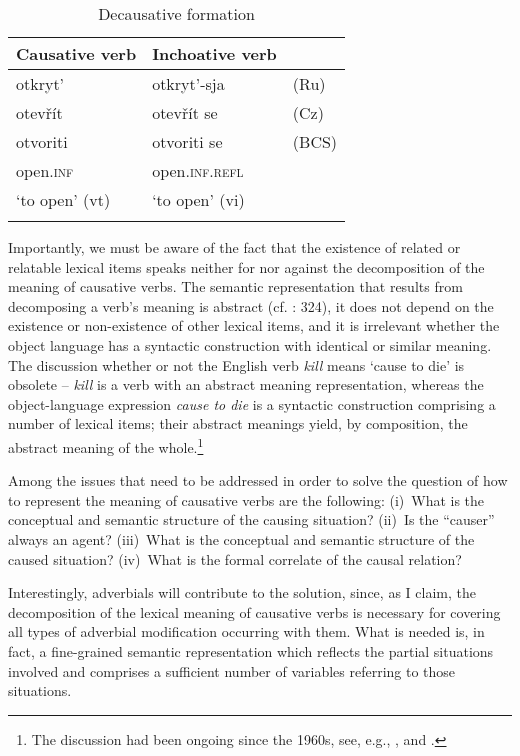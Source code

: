 \documentclass[output=paper]{langscibook}
\begin{document}
\begin{table}[h]
\begin{tabular}{lll}
\lsptoprule
{Causative verb} & {Inchoative verb} & \\
\midrule
 otkryt’ & otkryt’-sja &  (Ru)\\
 otevřít & otevřít se &  (Cz)\\
 otvoriti & otvoriti se &  (BCS)\\
 open.\textsc{inf} & open.\textsc{inf.refl} & \\
 ‘to open’ (vt) & ‘to open’ (vi) & \\
\lspbottomrule
\end{tabular}
\caption{Decausative formation}
\label{tab:junghanns:3}
\end{table}

Importantly, we must be aware of the fact that the existence of related or relatable lexical items speaks neither for nor against the decomposition of the meaning of causative verbs. The semantic representation that results from decomposing a verb’s meaning is abstract (cf. \citealt{Bierwisch2011}: 324), it does not depend on the existence or non-existence of other lexical items, and it is irrelevant whether the object language has a syntactic construction with identical or similar meaning. The discussion whether or not the English verb \textit{kill} means ‘cause to die’ is obsolete -- \textit{kill} is a verb with an abstract meaning representation, whereas the object-language expression \textit{cause to die} is a syntactic construction comprising a number of lexical items; their abstract meanings yield, by composition, the abstract meaning of the whole.\footnote{The discussion had been ongoing since the 1960s, see, e.g., \citet{McCawley1968uwe,Fodor1970,Wierzbicka1975,Shibatani1975,Shibatani1976ed,Shibatani1976,Saksena1982,FanselowStaudacher1991}, and \citet{Kulikov2001}.}

Among the issues that need to be addressed in order to solve the question of how to represent the meaning of causative verbs are the following: (i)~What is the conceptual and semantic structure of the causing situation? (ii)~Is the “causer” always an agent? (iii)~What is the conceptual and semantic structure of the caused situation? (iv)~What is the formal correlate of the causal relation?

Interestingly, adverbials will contribute to the solution, since, as I claim, the decomposition of the lexical meaning of causative verbs is necessary for covering all types of adverbial modification occurring with them. What is needed is, in fact, a fine-grained semantic representation which reflects the partial situations involved and comprises a sufficient number of variables referring to those situations.
\end{document}
